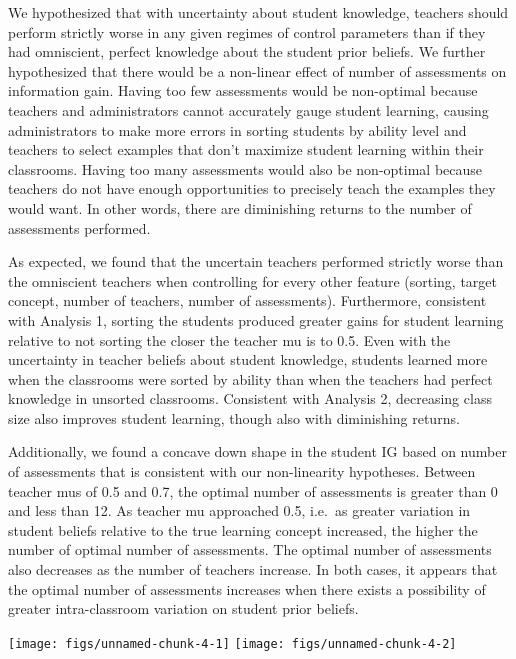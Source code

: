 \documentclass[10pt, letterpaper]{article}
\newenvironment{CodeChunk}{}{}
\begin{document}
We hypothesized that with uncertainty about student knowledge, teachers
should perform strictly worse in any given regimes of control parameters
than if they had omniscient, perfect knowledge about the student prior
beliefs. We further hypothesized that there would be a non-linear effect
of number of assessments on information gain. Having too few assessments
would be non-optimal because teachers and administrators cannot
accurately gauge student learning, causing administrators to make more
errors in sorting students by ability level and teachers to select
examples that don't maximize student learning within their classrooms.
Having too many assessments would also be non-optimal because teachers
do not have enough opportunities to precisely teach the examples they
would want. In other words, there are diminishing returns to the number
of assessments performed.

As expected, we found that the uncertain teachers performed strictly
worse than the omniscient teachers when controlling for every other
feature (sorting, target concept, number of teachers, number of
assessments). Furthermore, consistent with Analysis 1, sorting the
students produced greater gains for student learning relative to not
sorting the closer the teacher mu is to 0.5. Even with the uncertainty
in teacher beliefs about student knowledge, students learned more when
the classrooms were sorted by ability than when the teachers had perfect
knowledge in unsorted classrooms. Consistent with Analysis 2, decreasing
class size also improves student learning, though also with diminishing
returns.

Additionally, we found a concave down shape in the student IG based on
number of assessments that is consistent with our non-linearity
hypotheses. Between teacher mus of 0.5 and 0.7, the optimal number of
assessments is greater than 0 and less than 12. As teacher mu approached
0.5, i.e.~as greater variation in student beliefs relative to the true
learning concept increased, the higher the number of optimal number of
assessments. The optimal number of assessments also decreases as the
number of teachers increase. In both cases, it appears that the optimal
number of assessments increases when there exists a possibility of
greater intra-classroom variation on student prior beliefs.

\begin{CodeChunk}

\texttt{[image: figs/unnamed-chunk-4-1]} 
\texttt{[image: figs/unnamed-chunk-4-2]} \end{CodeChunk}
\end{document}
